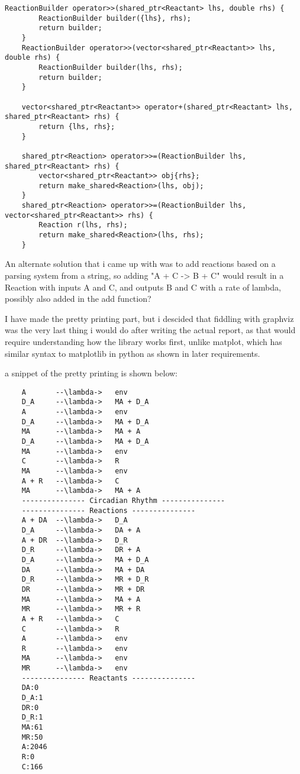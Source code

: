 \begin{lstlisting}[style=colorC++]
    ReactionBuilder operator>>(shared_ptr<Reactant> lhs, double rhs) {
        ReactionBuilder builder({lhs}, rhs);
        return builder;
    }
    ReactionBuilder operator>>(vector<shared_ptr<Reactant>> lhs, double rhs) {
        ReactionBuilder builder(lhs, rhs);
        return builder;
    }

    vector<shared_ptr<Reactant>> operator+(shared_ptr<Reactant> lhs, shared_ptr<Reactant> rhs) {
        return {lhs, rhs};
    }

    shared_ptr<Reaction> operator>>=(ReactionBuilder lhs, shared_ptr<Reactant> rhs) {
        vector<shared_ptr<Reactant>> obj{rhs};
        return make_shared<Reaction>(lhs, obj);
    }
    shared_ptr<Reaction> operator>>=(ReactionBuilder lhs, vector<shared_ptr<Reactant>> rhs) {
        Reaction r(lhs, rhs);
        return make_shared<Reaction>(lhs, rhs);
    }
\end{lstlisting}

An alternate solution that i came up with was to add reactions based on a parsing system from a string, so adding "A + C -> B + C" would result in a Reaction with inputs A and C, and outputs B and C with a rate of lambda, possibly also added in the add function?


I have made the pretty printing part, but i descided that fiddling with graphviz was the very last thing i would do after writing the actual report, as that would require understanding how the library works first, unlike matplot, which has similar syntax to matplotlib in python as shown in later requirements.

a snippet of the pretty printing is shown below:

\begin{lstlisting}
    A       --\lambda->   env
    D_A     --\lambda->   MA + D_A
    A       --\lambda->   env
    D_A     --\lambda->   MA + D_A
    MA      --\lambda->   MA + A
    D_A     --\lambda->   MA + D_A
    MA      --\lambda->   env
    C       --\lambda->   R
    MA      --\lambda->   env
    A + R   --\lambda->   C
    MA      --\lambda->   MA + A
    --------------- Circadian Rhythm ---------------
    --------------- Reactions ---------------
    A + DA  --\lambda->   D_A
    D_A     --\lambda->   DA + A
    A + DR  --\lambda->   D_R
    D_R     --\lambda->   DR + A
    D_A     --\lambda->   MA + D_A
    DA      --\lambda->   MA + DA
    D_R     --\lambda->   MR + D_R
    DR      --\lambda->   MR + DR
    MA      --\lambda->   MA + A
    MR      --\lambda->   MR + R
    A + R   --\lambda->   C
    C       --\lambda->   R
    A       --\lambda->   env
    R       --\lambda->   env
    MA      --\lambda->   env
    MR      --\lambda->   env
    --------------- Reactants ---------------
    DA:0
    D_A:1
    DR:0
    D_R:1
    MA:61
    MR:50
    A:2046
    R:0
    C:166
\end{lstlisting}

